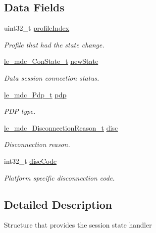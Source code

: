 \subsection*{Data Fields}
\begin{DoxyCompactItemize}
\item 
uint32\+\_\+t \hyperlink{structpa__mdc___session_state_data__t_a6cd35123192754cb4a335c4fffcbf7bd}{profile\+Index}
\begin{DoxyCompactList}\small\item\em Profile that had the state change. \end{DoxyCompactList}\item 
\hyperlink{le__mdc__interface_8h_a0727e543d0394422963c8d6297947333}{le\+\_\+mdc\+\_\+\+Con\+State\+\_\+t} \hyperlink{structpa__mdc___session_state_data__t_ade21f2da64f30583e06c528df39be9a9}{new\+State}
\begin{DoxyCompactList}\small\item\em Data session connection status. \end{DoxyCompactList}\item 
\hyperlink{le__mdc__interface_8h_a85721ec6046140c2f87c23f877dce247}{le\+\_\+mdc\+\_\+\+Pdp\+\_\+t} \hyperlink{structpa__mdc___session_state_data__t_a67bdd41e73229fa6f87a7fe5c939c79f}{pdp}
\begin{DoxyCompactList}\small\item\em P\+DP type. \end{DoxyCompactList}\item 
\hyperlink{le__mdc__interface_8h_ad1fe8909ae01a2f7e33fdbdc6938bf17}{le\+\_\+mdc\+\_\+\+Disconnection\+Reason\+\_\+t} \hyperlink{structpa__mdc___session_state_data__t_a6d51164c8245866a47dbd2ba67c8aa81}{disc}
\begin{DoxyCompactList}\small\item\em Disconnection reason. \end{DoxyCompactList}\item 
int32\+\_\+t \hyperlink{structpa__mdc___session_state_data__t_a4eb5683ae6d4efc619bba3a6b8a0be37}{disc\+Code}
\begin{DoxyCompactList}\small\item\em Platform specific disconnection code. \end{DoxyCompactList}\end{DoxyCompactItemize}


\subsection{Detailed Description}
Structure that provides the session state handler 

